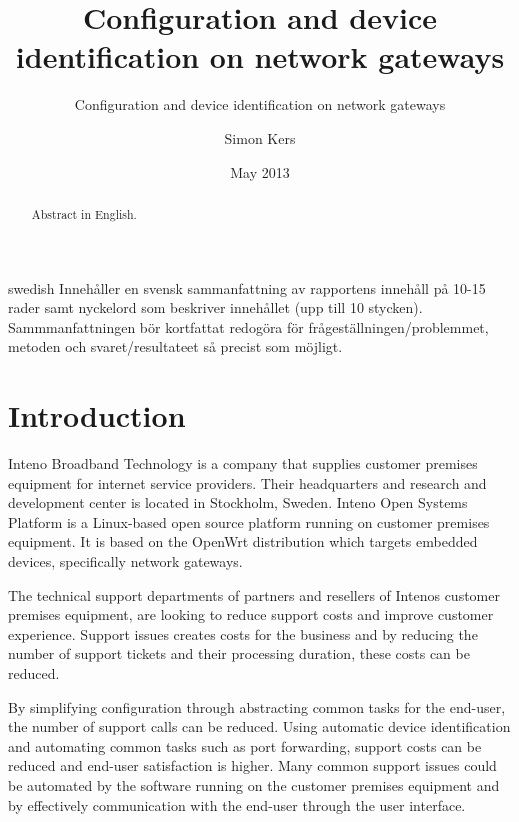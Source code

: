 \documentclass[a4paper,11pt]{kth-mag}
\title{Configuration and device identification on network gateways}
\subtitle{Configuration and device identification on network gateways}
\author{Simon Kers}
\date{May 2013}
\newcommand\blankpage{%
    \null
    \thispagestyle{empty}%
    \addtocounter{page}{-1}%
    \newpage}
\begin{document}
{}
\setcounter{page}{3}
\pagestyle{center}

\maketitle
{}
\begin{abstract}
   Abstract in English.

\end{abstract}
\newpage
\blankpage

\begin{foreignabstract}{swedish}
   Innehåller en svensk sammanfattning av rapportens innehåll på 10-15 rader samt nyckelord som beskriver innehållet (upp till 10 stycken).
   Sammmanfattningen bör kortfattat redogöra för frågeställningen/problemmet, metoden och svaret/resultateet så precist som möjligt.

\newpage
\blankpage

\end{foreignabstract}
\clearpage
\tableofcontents*
\mainmatter
\pagestyle{newchap}
\chapter{Introduction}
Inteno Broadband Technology is a company that supplies customer premises equipment for internet service providers.  
Their headquarters and research and development center is located in Stockholm, Sweden.  
Inteno Open Systems Platform is a Linux-based open source platform running on customer premises equipment.
It is based on the OpenWrt distribution which targets embedded devices, specifically network gateways. \cite{Inteno}

The technical support departments of partners and resellers of Intenos
customer premises equipment, are looking to reduce support costs and improve customer experience. 
Support issues creates costs for the business and by reducing the number of support tickets and their processing duration, these costs can be reduced.

By simplifying configuration through abstracting common tasks for the end-user, the number of support calls can be reduced.
Using automatic device identification and automating common tasks such as port forwarding, support costs can be reduced and end-user satisfaction is higher.
Many common support issues could be automated by the software running on the customer premises equipment and by effectively communication with the end-user through the user interface.
\end{document}

